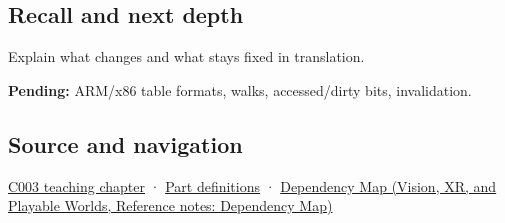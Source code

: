 \subsection{Recall and next depth}\label{appendix-01e5905165c4-recall-and-next-depth}

Explain what changes and what stays fixed in translation.

\textbf{Pending:} ARM/x86 table formats, walks, accessed/dirty bits, invalidation.

\subsection{Source and navigation}\label{appendix-01e5905165c4-source-and-navigation}

\hyperref[01-foundations-i-ch002-where-the-bytes-live]{C003 teaching chapter} · \hyperref[appendix-fd090d982a15-m003---parts-41-60]{Part definitions} · \href{../07-Vision-XR-and-Playable-Worlds/main.pdf\#nameddest=appendix-4ad47bdd269a}{Dependency Map (Vision, XR, and Playable Worlds, Reference notes: Dependency Map)}
